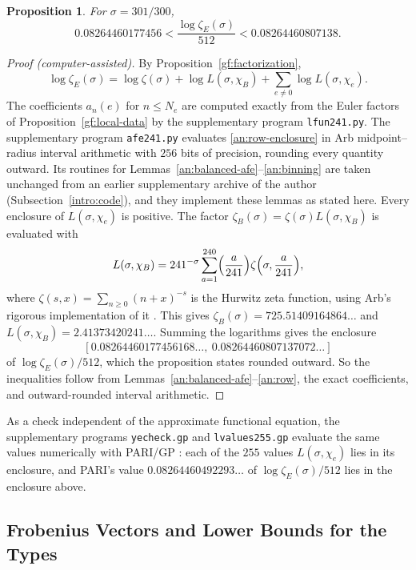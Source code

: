 \documentclass[11pt]{amsart}
\numberwithin{equation}{section}
\newtheorem{proposition}[equation]{Proposition}
\theoremstyle{definition}
\theoremstyle{remark}
\begin{document}
\begin{proposition}\label{an:genus-value}
For $\sigma=301/300$,
\[
 0.08264460177456<\frac{\log\zeta_E(\sigma)}{512}<0.08264460807138.
\]
\end{proposition}

\begin{proof}[Proof (computer-assisted)]
By Proposition~\ref{gf:factorization},
\[
 \log\zeta_E(\sigma)=\log\zeta(\sigma)+\log L(\sigma,\chi_B)
 +\sum_{e\ne0}\log L(\sigma,\chi_e).
\]
The coefficients $a_n(e)$ for $n\le N_e$ are computed exactly from the Euler
factors of Proposition~\ref{gf:local-data} by the supplementary program
\texttt{lfun241.py}. The supplementary program \texttt{afe241.py} evaluates
\eqref{an:row-enclosure} in Arb midpoint--radius interval arithmetic
\cite{Johansson2017,FLINT} with $256$ bits of precision, rounding every
quantity outward. Its routines for
Lemmas~\ref{an:balanced-afe}--\ref{an:binning} are taken unchanged from an
earlier supplementary archive of the author (Subsection~\ref{intro:code}), and
they implement these lemmas as stated here. Every enclosure of
$L(\sigma,\chi_e)$ is positive. The factor
$\zeta_B(\sigma)=\zeta(\sigma)L(\sigma,\chi_B)$ is evaluated with
\[
 L(\sigma,\chi_B)=241^{-\sigma}\sum_{a=1}^{240}\Bigl(\frac
 a{241}\Bigr)\zeta\Bigl(\sigma,\frac a{241}\Bigr),
\]
where $\zeta(s,x)=\sum_{n\ge0}(n+x)^{-s}$ is the Hurwitz zeta function,
using Arb's rigorous implementation of it \cite{Johansson2015Hurwitz}. This
gives $\zeta_B(\sigma)=725.51409164864\ldots$ and
$L(\sigma,\chi_B)=2.41373420241\ldots$. Summing the logarithms gives the
enclosure
\[
 [0.08264460177456168\ldots,\ 0.08264460807137072\ldots]
\]
of $\log\zeta_E(\sigma)/512$, which the proposition states rounded outward.
So the inequalities follow from
Lemmas~\ref{an:balanced-afe}--\ref{an:row}, the exact coefficients, and
outward-rounded interval arithmetic.
\end{proof}

As a check
independent of the approximate functional equation, the supplementary
programs \texttt{yecheck.gp} and \texttt{lvalues255.gp} evaluate the same
values numerically with PARI/GP \cite{PARI}: each of the $255$ values
$L(\sigma,\chi_e)$ lies in its enclosure, and PARI's value
$0.08264460492293\ldots$ of $\log\zeta_E(\sigma)/512$ lies in the enclosure
above.

\subsection{Frobenius Vectors and Lower Bounds for the Types}
\label{an:census}
\end{document}

